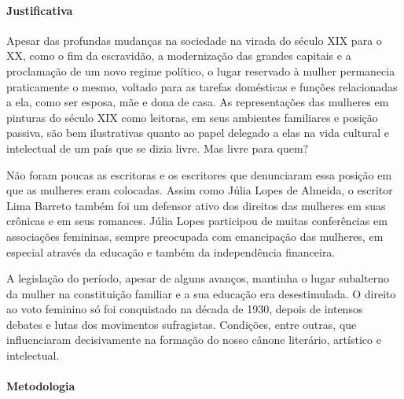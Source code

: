 \documentclass[12pt]{extarticle}
\begin{document}
\paragraph{Justificativa} Apesar das profundas mudanças na sociedade na
virada do século XIX para o XX, como o fim da escravidão, a modernização
das grandes capitais e a proclamação de um novo regime político, o lugar
reservado à mulher permanecia praticamente o mesmo, voltado para as
tarefas domésticas e funções relacionadas a ela, como ser esposa, mãe e
dona de casa. As representações das mulheres em pinturas do século XIX
como leitoras, em seus ambientes familiares e posição passiva, são bem
ilustrativas quanto ao papel delegado a elas na vida cultural e
intelectual de um país que se dizia livre. Mas livre para quem?





Não foram poucas as escritoras e os escritores que denunciaram essa
posição em que as mulheres eram colocadas. Assim como Júlia Lopes de
Almeida, o escritor Lima Barreto também foi um defensor ativo dos
direitos das mulheres em suas crônicas e em seus romances. Júlia Lopes
participou de muitas conferências em associações femininas, sempre
preocupada com emancipação das mulheres, em especial através da educação
e também da independência financeira.


A legislação do período, apesar de
alguns avanços, mantinha o lugar subalterno da mulher na constituição
familiar e a sua educação era desestimulada. O direito ao voto feminino
só foi conquistado na década de 1930, depois de intensos debates e lutas
dos movimentos sufragistas. Condições, entre outras, que influenciaram
decisivamente na formação do nosso cânone literário, artístico e
intelectual.




\paragraph{Metodologia}
\end{document}
